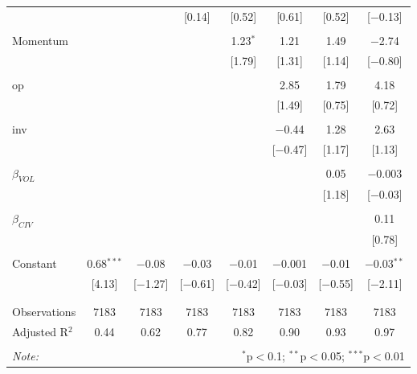 \documentclass[12pt]{article}
\begin{document}
\begin{table}[!htbp]
\begin{tabular}{@{\extracolsep{5pt}}lccccccc}
  &  &  & [0.14] & [0.52] & [0.61] & [0.52] & [$-$0.13] \\ 
  & & & & & & & \\ 
 Momentum &  &  &  & 1.23$^{*}$ & 1.21 & 1.49 & $-$2.74 \\ 
  &  &  &  & [1.79] & [1.31] & [1.14] & [$-$0.80] \\ 
  & & & & & & & \\ 
 op &  &  &  &  & 2.85 & 1.79 & 4.18 \\ 
  &  &  &  &  & [1.49] & [0.75] & [0.72] \\ 
  & & & & & & & \\ 
 inv &  &  &  &  & $-$0.44 & 1.28 & 2.63 \\ 
  &  &  &  &  & [$-$0.47] & [1.17] & [1.13] \\ 
  & & & & & & & \\ 
 $\beta_{VOL}$ &  &  &  &  &  & 0.05 & $-$0.003 \\ 
  &  &  &  &  &  & [1.18] & [$-$0.03] \\ 
  & & & & & & & \\ 
 $\beta_{CIV}$ &  &  &  &  &  &  & 0.11 \\ 
  &  &  &  &  &  &  & [0.78] \\ 
  & & & & & & & \\ 
 Constant & 0.68$^{***}$ & $-$0.08 & $-$0.03 & $-$0.01 & $-$0.001 & $-$0.01 & $-$0.03$^{**}$ \\ 
  & [4.13] & [$-$1.27] & [$-$0.61] & [$-$0.42] & [$-$0.03] & [$-$0.55] & [$-$2.11] \\ 
  & & & & & & & \\ 
\hline \\[-1.8ex] 
Observations & 7183 & 7183 & 7183 & 7183 & 7183 & 7183 & 7183 \\ 
Adjusted R$^{2}$ & 0.44 & 0.62 & 0.77 & 0.82 & 0.90 & 0.93 & 0.97 \\ 
\hline 
\hline \\[-1.8ex] 
\textit{Note:}  & \multicolumn{7}{r}{$^{*}$p$<$0.1; $^{**}$p$<$0.05; $^{***}$p$<$0.01} \\ 
\end{tabular} 
\end{table}
\end{document}
